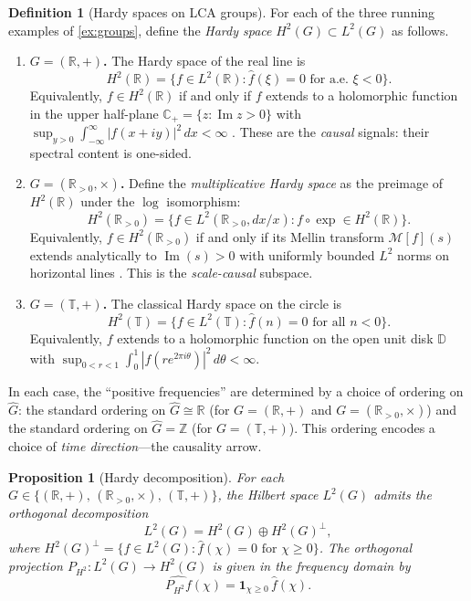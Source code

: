 \documentclass[12pt]{amsart}
\newtheorem{proposition}[theorem]{Proposition}
\theoremstyle{definition}
\newtheorem{definition}[theorem]{Definition}
\theoremstyle{remark}
\newcommand{\R}{\mathbb{R}}
\newcommand{\Rpos}{\mathbb{R}_{>0}}
\newcommand{\bT}{\mathbb{T}}
\newcommand{\Z}{\mathbb{Z}}
\newcommand{\cM}{\mathcal{M}}
\newcommand{\Htwo}{H^2}
\begin{document}
\begin{definition}[Hardy spaces on LCA groups]\label{def:hardy-space}
For each of the three running examples of \cref{ex:groups}, define the \emph{Hardy space} $\Htwo(G) \subset L^2(G)$ as follows.
\begin{enumerate}[label=(\alph*)]
\item \textbf{$G = (\R, +)$.} The Hardy space of the real line is
\[
\Htwo(\R) = \bigl\{f \in L^2(\R) : \widehat{f}(\xi) = 0 \text{ for a.e.\ } \xi < 0\bigr\}.
\]
Equivalently, $f \in \Htwo(\R)$ if and only if $f$ extends to a holomorphic function in the upper half-plane $\mathbb{C}_+ = \{z : \operatorname{Im} z > 0\}$ with
$\sup_{y > 0} \int_{-\infty}^{\infty} |f(x + iy)|^2\, dx < \infty$
\cite[Chapter~II]{Garnett}. These are the \emph{causal} signals: their spectral content is one-sided.

\item \textbf{$G = (\Rpos, \times)$.} Define the \emph{multiplicative Hardy space} as the preimage of $\Htwo(\R)$ under the $\log$ isomorphism:
\[
\Htwo(\Rpos) = \bigl\{f \in L^2(\Rpos, dx/x) : f \circ \exp \in \Htwo(\R)\bigr\}.
\]
Equivalently, $f \in \Htwo(\Rpos)$ if and only if its Mellin transform $\cM[f](s)$ extends analytically to $\operatorname{Im}(s) > 0$ with uniformly bounded $L^2$ norms on horizontal lines \cite[Chapter~4]{Hoffman}. This is the \emph{scale-causal} subspace.

\item \textbf{$G = (\bT, +)$.} The classical Hardy space on the circle is
\[
\Htwo(\bT) = \bigl\{f \in L^2(\bT) : \widehat{f}(n) = 0 \text{ for all } n < 0\bigr\}.
\]
Equivalently, $f$ extends to a holomorphic function on the open unit disk $\mathbb{D}$ with $\sup_{0 < r < 1} \int_0^1 |f(re^{2\pi i\theta})|^2\, d\theta < \infty$.
\end{enumerate}

In each case, the ``positive frequencies'' are determined by a choice of ordering on $\widehat{G}$: the standard ordering on $\widehat{G} \cong \R$ (for $G = (\R,+)$ and $G = (\Rpos,\times)$) and the standard ordering on $\widehat{G} = \Z$ (for $G = (\bT,+)$). This ordering encodes a choice of \emph{time direction}---the causality arrow.
\end{definition}

\begin{proposition}[Hardy decomposition]\label{prop:hardy-decomp}
For each $G \in \{(\R, +),\, (\Rpos, \times),\, (\bT, +)\}$, the Hilbert space $L^2(G)$ admits the orthogonal decomposition
\begin{equation}\label{eq:hardy-decomp}
L^2(G) = \Htwo(G) \oplus \Htwo(G)^\perp,
\end{equation}
where $\Htwo(G)^\perp = \{f \in L^2(G) : \widehat{f}(\chi) = 0 \text{ for } \chi \geq 0\}$. The orthogonal projection $P_{\Htwo} : L^2(G) \to \Htwo(G)$ is given in the frequency domain by
\[
\widehat{P_{\Htwo} f}(\chi) = \mathbf{1}_{\chi \geq 0}\, \widehat{f}(\chi).
\]
\end{proposition}
\end{document}
